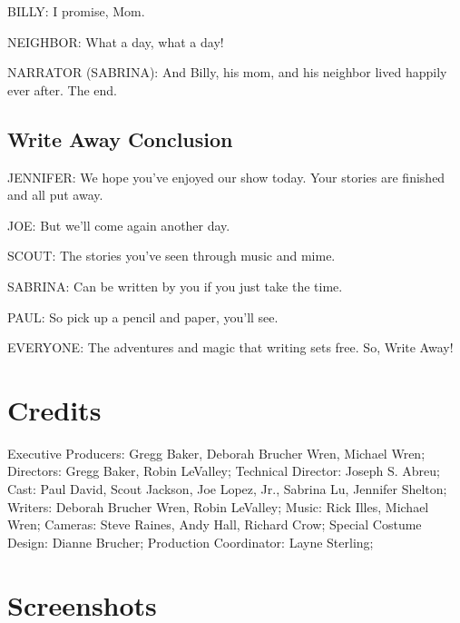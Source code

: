 BILLY:
I promise, Mom.

NEIGHBOR:
What a day, what a day!

NARRATOR (SABRINA):
And Billy, his mom, and his neighbor lived happily ever after.
The end.

\subsection{Write Away Conclusion}

JENNIFER:
We hope you've enjoyed our show today.
Your stories are finished and all put away.

JOE:
But we'll come again another day.

SCOUT:
The stories you've seen through music and mime.

SABRINA:
Can be written by you if you just take the time.

PAUL:
So pick up a pencil and paper, you'll see.

EVERYONE:
The adventures and magic that writing sets free.
So, Write Away!

\section{Credits}

Executive Producers: Gregg Baker, Deborah Brucher Wren, Michael Wren;
Directors: Gregg Baker, Robin LeValley;
Technical Director: Joseph S. Abreu;
Cast: Paul David, Scout Jackson, Joe Lopez, Jr., Sabrina Lu, Jennifer Shelton;
Writers: Deborah Brucher Wren, Robin LeValley;
Music: Rick Illes, Michael Wren;
Cameras: Steve Raines, Andy Hall, Richard Crow;
Special Costume Design: Dianne Brucher;
Production Coordinator: Layne Sterling;

\clearpage
\newpage

\section{Screenshots}

